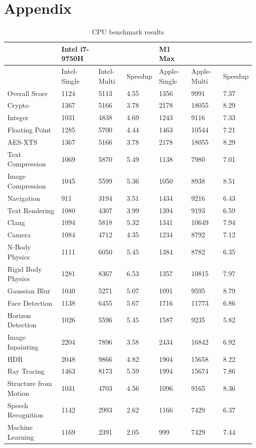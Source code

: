 \documentclass[11pt]{article}
\begin{document}
\section*{Appendix}
\begin{table}[!ht]
    \centering
    \begin{tabular}{|l|l|l|l|l|l|l|}
    \hline
        ~ & Intel i7-9750H & ~ & ~ & M1 Max & ~ & ~ \\ \hline
        ~ & Intel-Single & Intel-Multi & Speedup & Apple-Single & Apple-Multi & Speedup \\ \hline
        Overall Score & 1124 & 5113 & 4.55 & 1356 & 9991 & 7.37 \\ \hline
        Crypto & 1367 & 5166 & 3.78 & 2178 & 18055 & 8.29 \\ \hline
        Integer & 1031 & 4838 & 4.69 & 1243 & 9116 & 7.33 \\ \hline
        Floating Point & 1285 & 5700 & 4.44 & 1463 & 10544 & 7.21 \\ \hline
        AES-XTS & 1367 & 5166 & 3.78 & 2178 & 18055 & 8.29 \\ \hline
        Text Compression & 1069 & 5870 & 5.49 & 1138 & 7980 & 7.01 \\ \hline
        Image Compression & 1045 & 5599 & 5.36 & 1050 & 8938 & 8.51 \\ \hline
        Navigation & 911 & 3194 & 3.51 & 1434 & 9216 & 6.43 \\ \hline
        Text Rendering & 1080 & 4307 & 3.99 & 1394 & 9193 & 6.59 \\ \hline
        Clang & 1094 & 5818 & 5.32 & 1341 & 10649 & 7.94 \\ \hline
        Camera & 1084 & 4712 & 4.35 & 1234 & 8792 & 7.12 \\ \hline
        N-Body Physics & 1111 & 6050 & 5.45 & 1384 & 8782 & 6.35 \\ \hline
        Rigid Body Physics & 1281 & 8367 & 6.53 & 1357 & 10815 & 7.97 \\ \hline
        Gaussian Blur & 1040 & 5271 & 5.07 & 1091 & 9595 & 8.79 \\ \hline
        Face Detection & 1138 & 6455 & 5.67 & 1716 & 11773 & 6.86 \\ \hline
        Horizon Detection & 1026 & 5596 & 5.45 & 1587 & 9235 & 5.82 \\ \hline
        Image Inpainting & 2204 & 7896 & 3.58 & 2434 & 16842 & 6.92 \\ \hline
        HDR & 2048 & 9866 & 4.82 & 1904 & 15658 & 8.22 \\ \hline
        Ray Tracing & 1463 & 8173 & 5.59 & 1994 & 15674 & 7.86 \\ \hline
        Structure from Motion & 1031 & 4703 & 4.56 & 1096 & 9165 & 8.36 \\ \hline
        Speech Recognition & 1142 & 2993 & 2.62 & 1166 & 7429 & 6.37 \\ \hline
        Machine Learning & 1169 & 2391 & 2.05 & 999 & 7429 & 7.44 \\ \hline
    \end{tabular}
    \caption{CPU benchmark results}
\end{table}
\end{document}
